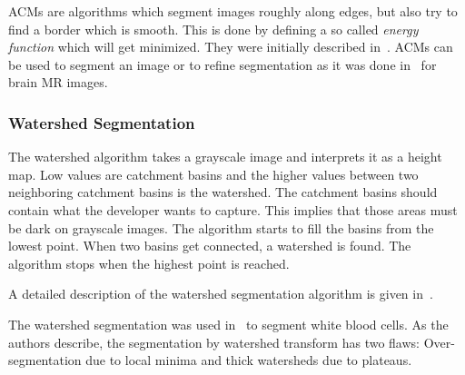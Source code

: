 \Glspl{ACM} are algorithms which segment images roughly along edges, but also
try to find a border which is smooth. This is done by defining a so called
\textit{energy function} which will get minimized. They were initially
described in~\cite{kass1988snakes}. \Glspl{ACM} can be used to segment an image
or to refine segmentation as it was done in~\cite{atkins1998fully} for brain
\gls{MR} images.


\subsubsection{Watershed Segmentation}\label{subsec:watershed}
The watershed algorithm takes a grayscale image and interprets it as a height
map. Low values are catchment basins and the higher values between two
neighboring catchment basins is the watershed. The catchment basins should
contain what the developer wants to capture. This implies that those areas
must be dark on grayscale images. The algorithm starts to fill the basins from
the lowest point. When two basins get connected, a watershed is found. The
algorithm stops when the highest point is reached.

A detailed description of the watershed segmentation algorithm is given
in~\cite{roerdink2000watershed}.

The watershed segmentation was used in~\cite{1260033} to segment white blood
cells. As the authors describe, the segmentation by watershed transform has
two flaws: Over-segmentation due to local minima and thick watersheds due to
plateaus.
